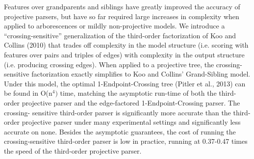 Features over grandparents and siblings have greatly improved the accuracy of projective parsers, but have so far required large increases in complexity when applied to arborescences or mildly non-projective models. We introduce a ``crossing-sensitive'' generalization of the third-order factorization of Koo and Collins (2010) that trades off complexity in the model structure (i.e. scoring with features over pairs and triples of edges) with complexity in the output structure (i.e. producing crossing edges). When applied to a projective tree, the crossing-sensitive factorization exactly simplifies to Koo and Collins' Grand-Sibling model. Under this model, the optimal 1-Endpoint-Crossing tree (Pitler et al., 2013) can be found in O(n$^4)$ time, matching the asymptotic run-time of both the third- order projective parser and the edge-factored 1-Endpoint-Crossing parser. The crossing- sensitive third-order parser is significantly more accurate than the third-order projective parser under many experimental settings and significantly less accurate on none. Besides the asymptotic guarantees, the cost of running the crossing-sensitive third-order parser is low in practice, running at 0.37-0.47 times the speed of the third-order projective parser.
